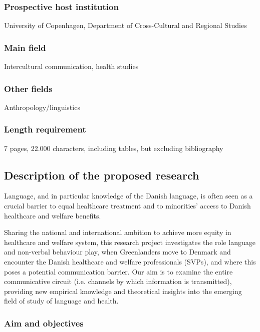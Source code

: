 \documentclass[twocolumn, issue, rga, authordate]{jote-new-article}
\begin{document}
\subsubsection{Prospective host institution}


University of Copenhagen, Department of Cross-Cultural and Regional Studies


\subsubsection{Main field}


Intercultural communication, health studies


\subsubsection{Other fields}


Anthropology/linguistics


\subsubsection{Length requirement}


7 pages, 22.000 characters, including tables, but excluding bibliography


\subsection{Description of the proposed research}


Language, and in particular knowledge of the Danish language, is often seen as a crucial barrier to equal healthcare treatment and to minorities' access to Danish healthcare and welfare benefits.

Sharing the national and international ambition to achieve more equity in healthcare and welfare system, this research project investigates the role language and non-verbal behaviour play, when Greenlanders move to Denmark and encounter the Danish healthcare and welfare professionals
(SVPs), and where this poses a potential communication barrier. Our aim is to examine the entire communicative circuit (i.e. channels by which information is transmitted), providing new empirical knowledge and theoretical insights into the emerging field of study of language and health.


\subsubsection{Aim and objectives}
\end{document}
